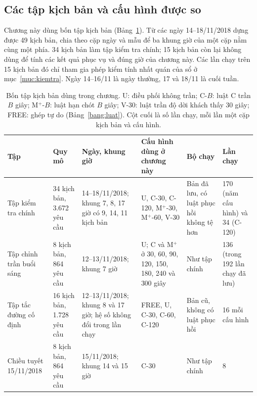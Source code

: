 \subsection{Các tập kịch bản và cấu hình được so}
\label{muc:c4-taptu}

Chương này dùng bốn tập kịch bản (Bảng~\ref{bang:c4-taptu}). Từ các ngày 14--18/11/2018 dựng được 49 kịch bản, chia
theo cặp ngày và mẫu để ba khung giờ của một cặp nằm cùng một phía. 34 kịch bản làm tập kiểm tra chính; 15 kịch bản
còn lại không dùng để tính các kết quả phục vụ và đúng giờ của chương này. Các lần chạy trên 15 kịch bản đó chỉ tham
gia phép kiểm tính nhất quán của sổ ở mục~\ref{muc:kiemtra}. Ngày 14--16/11 là ngày thường, 17 và 18/11 là cuối tuần.

\begin{table}[htbp]
\centering
\caption{Bốn tập kịch bản dùng trong chương. U: điều phối không trần; C-$B$: luật C trần $B$ giây;
M$^{+}$-$B$: luật hạn chót $B$ giây; V-30: luật trần độ dời khách thấy 30 giây; FREE: ghép tự do
(Bảng~\ref{bang:luat}). Cột cuối là số lần chạy, mỗi lần một cặp kịch bản và cấu hình.}
\label{bang:c4-taptu}
\footnotesize
\setlength{\tabcolsep}{2.5pt}
\begin{tabular}{@{}p{2.5cm}p{1.9cm}p{3.1cm}p{3.0cm}p{2.6cm}p{1.9cm}@{}}
\toprule
\textbf{Tập} & \textbf{Quy mô} & \textbf{Ngày, khung giờ} & \textbf{Cấu hình dùng ở chương này} &
\textbf{Bộ chạy} & \textbf{Lần chạy}\\
\midrule
Tập kiểm tra chính & 34 kịch bản, 3.672 yêu cầu & 14--18/11/2018; khung 7, 8, 17 giờ có 9, 14, 11
kịch bản & U, C-30, C-120, M$^{+}$-30, M$^{+}$-60, V-30 & Bản đã lưu, có luật phục hồi không tệ hơn &
170 (năm cấu hình) và 34 (C-120)\\
Tập chỉnh trần buổi sáng & 8 kịch bản, 864 yêu cầu & 12--13/11/2018; khung 7 giờ & U; C và M$^{+}$ ở 30, 60,
90, 120, 150, 180, 240 và 300 giây & Như tập chính & 136 (trong 192 lần chạy đã lưu)\\
Tập tắc đường cố định & 16 kịch bản, 1.728 yêu cầu & 12--13/11/2018; khung 8 và 17 giờ; hệ số không
đổi trong lần chạy & FREE, U, C-30, C-60, C-120 & Bản cũ, không có luật phục hồi & 16 mỗi cấu hình\\
Chiều tuyết 15/11/2018 & 8 kịch bản, 864 yêu cầu & 15/11/2018; khung 14 và 15 giờ & C-30 &
Như tập chính & 8\\
\bottomrule
\end{tabular}
\end{table}

